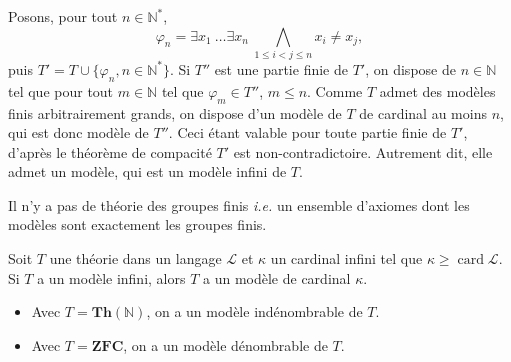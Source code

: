 \documentclass[./main]{subfiles}
\begin{document}
  \begin{prv}
    Posons, pour tout $n \in \mathds{N}^*$,
    \[\varphi_n = \exists x_1 \: \ldots \exists x_n \: \bigwedge_{1 \le i < j \le n} x_i \ne x_j,\]
    \noindent{}puis $T' = T \cup \{\varphi_n, n \in \mathds{N}^*\}$. Si $T''$ est une partie finie de $T'$, on dispose de $n \in \mathds{N}$ tel que pour tout $m \in \mathds{N}$ tel que $\varphi_m \in T''$, $m \le n$. Comme $T$ admet des modèles finis arbitrairement grands, on dispose d'un modèle de $T$ de cardinal au moins $n$, qui est donc modèle de $T''$. Ceci étant valable pour toute partie finie de $T'$, d'après le théorème de compacité $T'$ est non-contradictoire. Autrement dit, elle admet un modèle, qui est un modèle infini de $T$.
  \end{prv}

  \begin{crlr}
    Il n'y a pas de théorie des groupes finis \textit{i.e.} un ensemble d'axiomes dont les modèles sont exactement les groupes finis.
  \end{crlr}

  \begin{thm}
    Soit $T$ une théorie dans un langage $\mathcal{L}$ et $\kappa$ un cardinal infini tel que $\kappa \ge \operatorname{card} \mathcal{L}$.
    Si $T$ a un modèle infini, alors $T$ a un modèle de cardinal $\kappa$.
  \end{thm}

  \begin{exm}\hfill
    \begin{itemize}
      \item Avec $T = \mathbf{Th}(\mathds{N})$, on a un modèle indénombrable de $T$.
      \item Avec $T = \mathbf{ZFC}$, on a un modèle dénombrable de $T$.
    \end{itemize}
  \end{exm}
\end{document}
